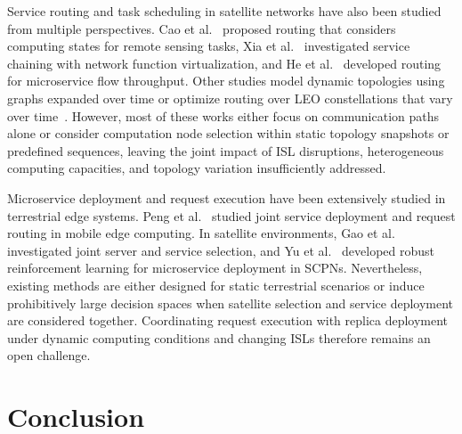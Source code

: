 \documentclass[10pt, conference, letterpaper]{IEEEtran}
\begin{document}
Service routing and task scheduling in satellite networks have also been studied from multiple perspectives.
Cao et al.~\cite{cao_comp_routing} proposed routing that considers computing states for remote sensing tasks, Xia et al.~\cite{sc_nfv_tmc2024} investigated service chaining with network function virtualization, and He et al.~\cite{service_pressure} developed routing for microservice flow throughput. Other studies model dynamic topologies using graphs expanded over time or optimize routing over LEO constellations that vary over time~\cite{liu2023time_expanded_graph,routing_optim_in_multi_domain,cross_slot_optim_infocom2025}.
However, most of these works either focus on communication paths alone or consider computation node selection within static topology snapshots or predefined sequences, leaving the joint impact of ISL disruptions, heterogeneous computing capacities, and topology variation insufficiently addressed.

Microservice deployment and request execution have been extensively studied in terrestrial edge systems.
Peng et al.~\cite{optim_svc_dep_req_reouting_in_MEC} studied joint service deployment and request routing in mobile edge computing. In satellite environments, Gao et al.~\cite{optim4server_svc_place_in_STIECN} investigated joint server and service selection, and Yu et al.~\cite{yu_deploy_tmc2025} developed robust reinforcement learning for microservice deployment in SCPNs.
Nevertheless, existing methods are either designed for static terrestrial scenarios or induce prohibitively large decision spaces when satellite selection and service deployment are considered together. Coordinating request execution with replica deployment under dynamic computing conditions and changing ISLs therefore remains an open challenge.

\section{Conclusion}
\label{sec:conclusion}
\end{document}
